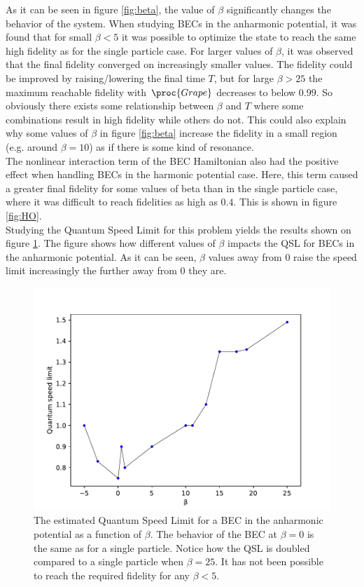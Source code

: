 \documentclass[aps,pra,reprint,superscriptaddress]{revtex4-1}
\begin{document}
As it can be seen in figure \ref{fig:beta}, the value of $\beta$ significantly changes the behavior of the system. When studying BECs in the anharmonic potential, it was found that for small $\beta<5$ it was possible to optimize the state to reach the same high fidelity as for the single particle case. For larger values of $\beta$, it was observed that the final fidelity converged on increasingly smaller values. The fidelity could be improved by raising/lowering the final time $T$, but for large $\beta > 25$ the maximum reachable fidelity with $\proc{Grape}$ decreases to below $0.99$. So obviously there exists some relationship between $\beta$ and $T$ where some combinations result in high fidelity while others do not. This could also explain why some values of $\beta$ in figure \ref{fig:beta} increase the fidelity in a small region (e.g. around $\beta=10$) as if there is some kind of resonance. \\

The nonlinear interaction term of the BEC Hamiltonian also had the positive effect when handling BECs in the harmonic potential case. Here, this term caused a greater final fidelity for some values of beta than in the single particle case, where it was difficult to reach fidelities as high as $0.4$. This is shown in figure \ref{fig:HO}.\\


Studying the Quantum Speed Limit for this problem yields the results shown on figure \ref{fig:QSL}. The figure shows how different values of $\beta$ impacts the QSL for BECs in the anharmonic potential. As it can be seen, $\beta$ values away from 0 raise the speed limit increasingly the further away from 0 they are. \\

\begin{figure}[h]
	\includegraphics[width=\columnwidth]{graphics/QSL.pdf}
	\caption{The estimated Quantum Speed Limit for a BEC in the anharmonic potential as a function of $\beta$. The behavior of the BEC at $\beta=0$ is the same as for a single particle. Notice how the QSL is doubled compared to a single particle when $\beta=25$. It has not been possible to reach the required fidelity for any $\beta < 5$.}
	\label{fig:QSL}
\end{figure}
\end{document}
